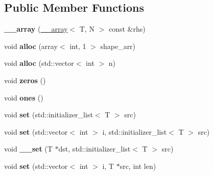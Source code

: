 \subsection*{Public Member Functions}
\begin{DoxyCompactItemize}
\item 
\hypertarget{class____array_ac3443fee161fd3f8ccb1290980a4190d}{
{\bfseries \_\-\_\-array} (\hyperlink{class____array}{\_\-\_\-array}$<$ T, N $>$ const \&rhs)}
\label{class____array_ac3443fee161fd3f8ccb1290980a4190d}

\item 
\hypertarget{class____array_a8a0f0e9f3af8384c29ddd21d3451b65e}{
void {\bfseries alloc} (array$<$ int, 1 $>$ shape\_\-arr)}
\label{class____array_a8a0f0e9f3af8384c29ddd21d3451b65e}

\item 
\hypertarget{class____array_a0ffa8a127e271c2ae60c705e5baaf6d1}{
void {\bfseries alloc} (std::vector$<$ int $>$ n)}
\label{class____array_a0ffa8a127e271c2ae60c705e5baaf6d1}

\item 
\hypertarget{class____array_a1072f5c538102121515000a4ef521303}{
void {\bfseries zeros} ()}
\label{class____array_a1072f5c538102121515000a4ef521303}

\item 
\hypertarget{class____array_ad1fd7d5c46fb341f54cab916b78be561}{
void {\bfseries ones} ()}
\label{class____array_ad1fd7d5c46fb341f54cab916b78be561}

\item 
\hypertarget{class____array_ae6a7f942aeb5857504e9db83f7cfac57}{
void {\bfseries set} (std::initializer\_\-list$<$ T $>$ src)}
\label{class____array_ae6a7f942aeb5857504e9db83f7cfac57}

\item 
\hypertarget{class____array_a483485b393733908c01c2cb2e74d08e0}{
void {\bfseries set} (std::vector$<$ int $>$ i, std::initializer\_\-list$<$ T $>$ src)}
\label{class____array_a483485b393733908c01c2cb2e74d08e0}

\item 
\hypertarget{class____array_af9523af4f7911a07f54d8fce750e3332}{
void {\bfseries \_\-\_\-set} (T $\ast$dst, std::initializer\_\-list$<$ T $>$ src)}
\label{class____array_af9523af4f7911a07f54d8fce750e3332}

\item 
\hypertarget{class____array_a272fe82c6f31832970e123ac4ca66b08}{
void {\bfseries set} (std::vector$<$ int $>$ i, T $\ast$src, int len)}
\label{class____array_a272fe82c6f31832970e123ac4ca66b08}


\end{DoxyCompactItemize}
